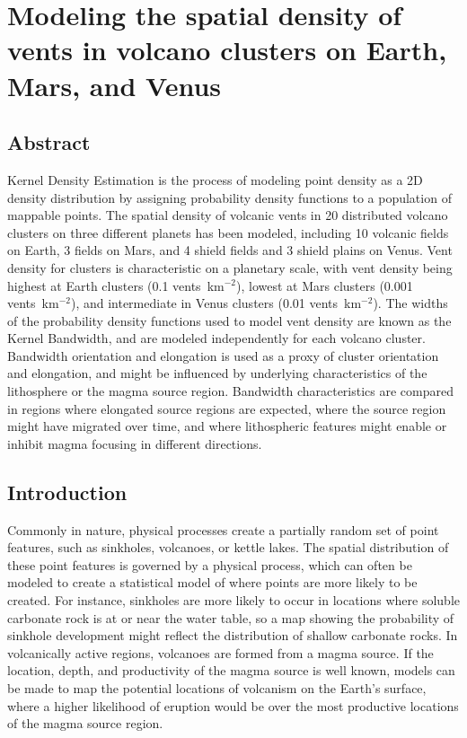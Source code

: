 \chapter[Modeling the spatial density of vents in volcano clusters on Earth, Mars, and Venus]{Modeling the spatial density of vents in volcano clusters on Earth, Mars, and Venus}\label{ch_kde}

\renewcommand*{\FigPath}{figures/chapter-spatial_density}

\section{Abstract}
Kernel Density Estimation is the process of modeling point density as a 2D density distribution by assigning probability density functions to a population of mappable points. The spatial density of volcanic vents in 20 distributed volcano clusters on three different planets has been modeled, including 10 volcanic fields on Earth, 3 fields on Mars, and 4 shield fields and 3 shield plains on Venus. Vent density for clusters is characteristic on a planetary scale, with vent density being highest at Earth clusters (0.1 vents~km$^{-2}$), lowest at Mars clusters (0.001 vents~km$^{-2}$), and intermediate in Venus clusters (0.01 vents~km$^{-2}$). The widths of the probability density functions used to model vent density are known as the Kernel Bandwidth, and are modeled independently for each volcano cluster. Bandwidth orientation and elongation is used as a proxy of cluster orientation and elongation, and might be influenced by underlying characteristics of the lithosphere or the magma source region. Bandwidth characteristics are compared in regions where elongated source regions are expected, where the source region might have migrated over time, and where lithospheric features might enable or inhibit magma focusing in different directions.

\section{Introduction}

Commonly in nature, physical processes create a partially random set of point features, such as sinkholes, volcanoes, or kettle lakes. The spatial distribution of these point features is governed by a physical process, which can often be modeled to create a statistical model of where points are more likely to be created. For instance, sinkholes are more likely to occur in locations where soluble carbonate rock is at or near the water table, so a map showing the probability of sinkhole development might reflect the distribution of shallow carbonate rocks. In volcanically active regions, volcanoes are formed from a magma source. If the location, depth, and productivity of the magma source is well known, models can be made to map the potential locations of volcanism on the Earth's surface, where a higher likelihood of eruption would be over the most productive locations of the magma source region. 

